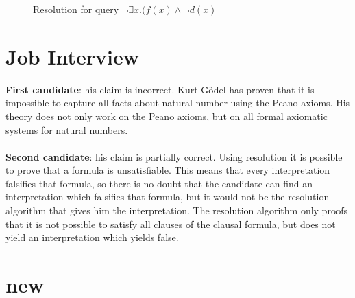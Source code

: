 \documentclass[]{article}
\begin{document}
\begin{figure}[h]
\centering
{}
\caption{Resolution for query $\neg\exists x.(f(x) \wedge\neg d(x)$} \label{fig:Res}
\end{figure}

\section{Job Interview}
\textbf{First candidate}:  his claim is incorrect. Kurt G\"odel has proven that it is impossible to capture all facts about natural number using the Peano axioms. His theory does not only work on the Peano axioms, but on all formal axiomatic systems for natural numbers.\\
\\
\textbf{Second candidate}:  his claim is partially correct. Using resolution it is possible to prove that a formula is unsatisfiable. This means that every interpretation falsifies that formula, so there is no doubt that the candidate can find an interpretation which falsifies that formula, but it would not be the resolution algorithm that gives him the interpretation. The resolution algorithm only proofs that it is not possible to satisfy all clauses of the clausal formula, but does not yield an interpretation which yields false.
\section{new}
\end{document}
